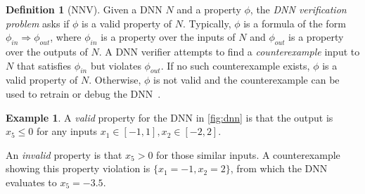 \documentclass[oneside,11pt,dvipsnames]{book}
\numberwithin{equation}{section}
\theoremstyle{definition}
\newtheorem{definition}{Definition}[section]
\newtheorem{example}{Example}[section]
\theoremstyle{remark}
\begin{document}
\begin{definition}[NNV]
Given a DNN \(N\) and a property $\phi$, the \emph{DNN verification problem} asks if $\phi$ is a valid property of $N$.
Typically, $\phi$ is a formula of the form $\phi_{in} \Rightarrow \phi_{out}$, where $\phi_{in}$ is a property over the inputs of $N$ and $\phi_{out}$ is a property over the outputs of $N$.
A DNN verifier attempts to find a \emph{counterexample} input to $N$ that satisfies $\phi_{in}$ but violates $\phi_{out}$.  If no such counterexample exists, $\phi$ is a valid property of $N$. Otherwise, $\phi$ is not valid and the counterexample can be used to retrain or debug the DNN~\cite{huang2017safety}.
\end{definition}






\begin{example}\label{ex:dnn}
A \emph{valid} property for the DNN in \autoref{fig:dnn} is that the output is $x_5 \le 0$ for any inputs $x_1 \in [-1,1], x_2\in[-2,2]$. 

An \emph{invalid} property is that $x_5 > 0$ for those similar inputs.
A counterexample showing this property violation is $\{x_1=-1, x_2=2\}$, from which the DNN evaluates to $x_5=-3.5$. 
\end{example}

\end{document}
